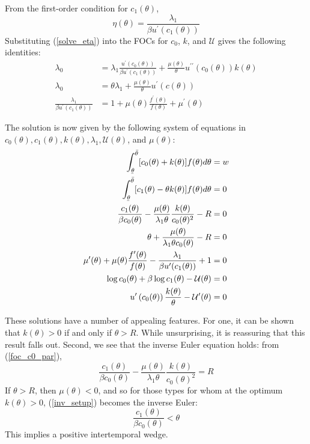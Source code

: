 \documentclass[11pt]{article}
\newcommand{\ubar}[1]{\underaccent{\bar}{#1}}
\newcommand{\p}{\prime}
\newcommand{\U}{\mathcal{U}}
\begin{document}
From the first-order condition for \( c_1(\theta) \), 
\begin{equation}
    \eta(\theta) = \frac{\lambda_1}{\beta u^\p(c_1(\theta))} \label{solve_eta}
\end{equation}
Substituting (\ref{solve_eta}) into the FOCs for \( c_0 \), \( k \), and \( \U \) gives the following identities:
\begin{align}
    \lambda_0 &= \lambda_1 \frac{u^\p(c_0(\theta))}{\beta u^\p(c_1(\theta))} + \frac{\mu(\theta)}{\theta} u^{\p\p}(c_0(\theta))k(\theta) \label{foc_c0} \\
    \lambda_0 &= \theta\lambda_1 + \frac{\mu(\theta)}{\theta}u^\p(c(\theta)) \label{foc_k} \\
    \frac{\lambda_1}{\beta u^\p(c_1(\theta))} &= 1 + \mu(\theta)\frac{f^\p(\theta)}{f(\theta)} + \mu^\p(\theta) \label{foc_U}
\end{align}

The solution is now given by the following system of equations in \( c_0(\theta), c_1(\theta), k(\theta), \lambda_1, \U(\theta) \), and \( \mu(\theta) \): 
\begin{align}
    \int_{\ubar{\theta}}^{\bar{\theta}}[c_0(\theta) + k(\theta)]f(\theta)d\theta &= w \\
    \int_{\ubar{\theta}}^{\bar{\theta}} [c_1(\theta) - \theta k(\theta)]f(\theta)d\theta &= 0 \\
    \frac{c_1(\theta)}{\beta c_0(\theta)} - \frac{\mu(\theta)}{\lambda_1 \theta}\frac{k(\theta)}{c_0(\theta)^2} - R &= 0 \label{foc_c0_par} \\
    \theta + \frac{\mu(\theta)}{\lambda_1\theta c_0(\theta)} - R &= 0 \label{foc_k_par} \\
    \mu^\p(\theta) + \mu(\theta)\frac{f^\p(\theta)}{f(\theta)} - \frac{\lambda_1}{\beta u^\p(c_1(\theta))} + 1 &= 0 \\
    \log c_0(\theta) + \beta\log c_1(\theta) - \U(\theta) &= 0 \label{pkc_par} \\
    u^\p \left( c_0(\theta) \right)\frac{k(\theta)}{\theta} - \U^\p(\theta) &= 0 \label{ic_par}
\end{align}

These solutions have a number of appealing features. For one, it can be shown that \( k(\theta) > 0 \) if and only if \( \theta > R \). While unsurprising, it is reassuring that this result falls out. Second, we see that the inverse Euler equation holds: from (\ref{foc_c0_par}), 
\begin{equation}
    \frac{c_1(\theta)}{\beta c_0(\theta)} - \frac{\mu(\theta)}{\lambda_1 \theta}\frac{k(\theta)}{c_0(\theta)^2} = R \label{inv_setup}
\end{equation}
If \( \theta > R \), then \( \mu(\theta) < 0 \), and so for those types for whom at the optimum \( k(\theta) > 0 \), (\ref{inv_setup}) becomes the inverse Euler:
\begin{equation}
    \frac{c_1(\theta)}{\beta c_0(\theta)} < \theta
\end{equation}
This implies a positive intertemporal wedge. 
\end{document}
